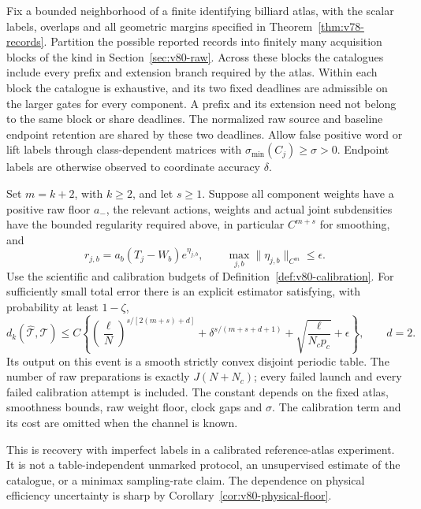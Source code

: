 \begin{theorem}
\label{thm:v80-finite-geometry}
Fix a bounded neighborhood of a finite identifying billiard atlas, with
the scalar labels, overlaps and all geometric margins specified in
Theorem~\ref{thm:v78-records}.  Partition the possible reported records
into finitely many acquisition blocks of the kind in
Section~\ref{sec:v80-raw}.  Across these blocks the catalogues include every prefix and extension
branch required by the atlas.  Within each block the catalogue is
exhaustive, and its two fixed deadlines are admissible on the larger
gates for every component.  A prefix and its extension need not belong
to the same block or share deadlines.  The normalized raw source and baseline endpoint retention
are shared by these two deadlines.  Allow false positive word or lift
labels through class-dependent matrices with
$\sigma_{\min}(C_j)\ge\sigma>0$.  Endpoint labels are otherwise
observed to coordinate accuracy $\delta$.

Set $m=k+2$, with $k\ge2$, and let $s\ge1$.  Suppose all component
weights have a positive raw floor $a_-$, the relevant actions, weights
and actual joint subdensities have the bounded regularity required
above, in particular $C^{m+s}$ for smoothing, and
\[
             r_{j,b}=a_b(T_j-W_b)e^{\eta_{j,b}},\qquad
             \max_{j,b}\|\eta_{j,b}\|_{C^m}\le\epsilon.
\]
Use the scientific and calibration budgets of
Definition~\ref{def:v80-calibration}.  For sufficiently small total
error there is an explicit estimator satisfying, with probability
at least $1-\zeta$,
\begin{equation}\label{eq:v80-geometric-rate}
 d_k(\widehat{\mathcal T},\mathcal T)
 \le C\left\{
       \left(\frac{\ell}{N}\right)^{s/[2(m+s)+d]}
       +\delta^{s/(m+s+d+1)}
       +\sqrt{\frac{\ell}{N_cp_c}}+\epsilon\right\},\qquad d=2.
\end{equation}
Its output on this event is a smooth strictly convex disjoint periodic
table.  The number of raw preparations is exactly $J(N+N_c)$; every
failed launch and every failed calibration attempt is included.  The
constant depends on the fixed atlas, smoothness bounds, raw weight
floor, clock gaps and $\sigma$.  The calibration term and its cost are
omitted when the channel is known.

This is recovery with imperfect labels in a calibrated reference-atlas
experiment.  It is not a table-independent unmarked protocol, an
unsupervised estimate of the catalogue, or a minimax sampling-rate
claim.  The dependence on physical efficiency uncertainty is sharp
by Corollary~\ref{cor:v80-physical-floor}.
\end{theorem}
